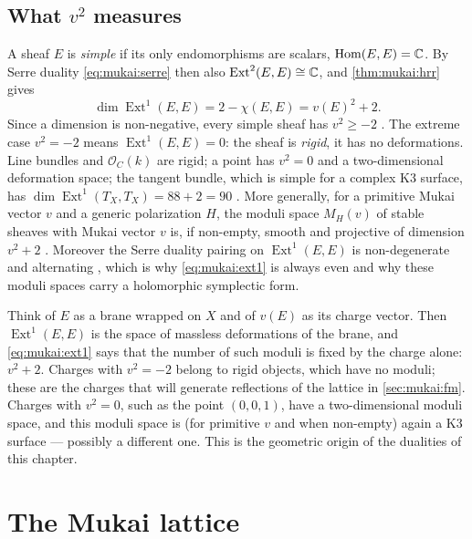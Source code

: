 \subsection{What $v^2$ measures}
A sheaf $E$ is \emph{simple} if its only endomorphisms are scalars,
$\operatorname{Hom}(E,E)=\mathbb{C}$. By Serre duality \eqref{eq:mukai:serre} then also
$\operatorname{Ext}^2(E,E)\cong\mathbb{C}$, and \cref{thm:mukai:hrr} gives
\begin{equation}\label{eq:mukai:ext1}
  \dim\operatorname{Ext}^1(E,E)=2-\chi(E,E)=v(E)^2+2 .
\end{equation}
Since a dimension is non-negative, every simple sheaf has $v^2\ge-2$
. The extreme case $v^2=-2$ means
$\operatorname{Ext}^1(E,E)=0$: the sheaf is \emph{rigid}, it has no deformations. Line bundles
and $\mathcal O_C(k)$ are rigid; a point has $v^2=0$ and a two-dimensional deformation space;
the tangent bundle, which is simple for a complex K3 surface, has
$\dim\operatorname{Ext}^1(T_X,T_X)=88+2=90$ . More
generally, for a primitive Mukai vector $v$ and a generic polarization $H$, the moduli space
$M_H(v)$ of stable sheaves with Mukai vector $v$ is, if non-empty, smooth and projective of
dimension $v^2+2$ . Moreover the Serre duality
pairing on $\operatorname{Ext}^1(E,E)$ is non-degenerate and alternating
, which is why \eqref{eq:mukai:ext1} is always even
and why these moduli spaces carry a holomorphic symplectic form.

\begin{physicsbox}
Think of $E$ as a brane wrapped on $X$ and of $v(E)$ as its charge vector. Then
$\operatorname{Ext}^1(E,E)$ is the space of massless deformations of the brane, and
\eqref{eq:mukai:ext1} says that the number of such moduli is fixed by the charge alone:
$v^2+2$. Charges with $v^2=-2$ belong to rigid objects, which have no moduli; these are the
charges that will generate reflections of the lattice in \cref{sec:mukai:fm}. Charges with
$v^2=0$, such as the point $(0,0,1)$, have a two-dimensional moduli space, and this moduli
space is (for primitive $v$ and when
non-empty) again a K3 surface --- possibly a different one. This is the geometric origin of the
dualities of this chapter.
\end{physicsbox}

\section{The Mukai lattice}\label{sec:mukai:lattice}


